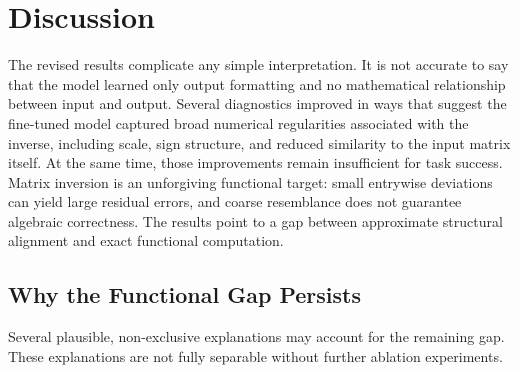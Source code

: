 \section{Discussion}
\label{sec:discussion}

The revised results complicate any simple interpretation. It is not accurate to say that the model learned only output formatting and no mathematical relationship between input and output. Several diagnostics improved in ways that suggest the fine-tuned model captured broad numerical regularities associated with the inverse, including scale, sign structure, and reduced similarity to the input matrix itself. At the same time, those improvements remain insufficient for task success. Matrix inversion is an unforgiving functional target: small entrywise deviations can yield large residual errors, and coarse resemblance does not guarantee algebraic correctness. The results point to a gap between approximate structural alignment and exact functional computation.

\subsection{Why the Functional Gap Persists}

Several plausible, non-exclusive explanations may account for the remaining gap. These explanations are not fully separable without further ablation experiments.

